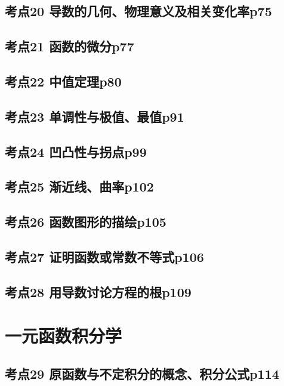 \section{考点20 导数的几何、物理意义及相关变化率p75}

\section{考点21 函数的微分p77}

\section{考点22 中值定理p80}

\section{考点23 单调性与极值、最值p91}

\section{考点24 凹凸性与拐点p99}

\section{考点25 渐近线、曲率p102}

\section{考点26 函数图形的描绘p105}

\section{考点27 证明函数或常数不等式p106}

\section{考点28 用导数讨论方程的根p109}

\chapter{一元函数积分学}

\section{考点29 原函数与不定积分的概念、积分公式p114}

